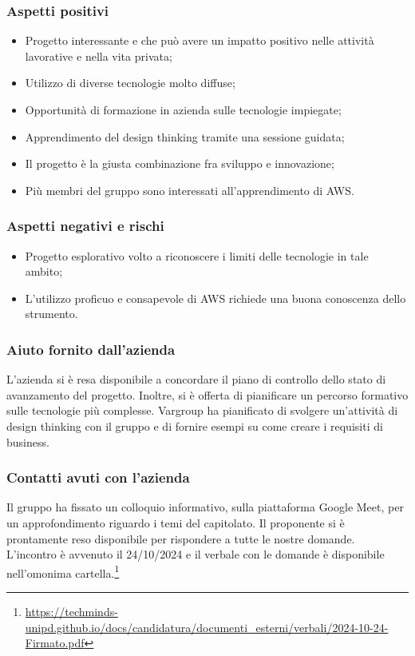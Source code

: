 \documentclass[10pt]{article}
\begin{document}
\subsubsection{Aspetti positivi}
\begin{itemize}
    \item Progetto interessante e che può avere un impatto positivo nelle attività lavorative e nella vita privata;
    \item Utilizzo di diverse tecnologie molto diffuse;
    \item Opportunità di formazione in azienda sulle tecnologie impiegate;
    \item Apprendimento del design thinking tramite una sessione guidata;
    \item Il progetto è la giusta combinazione fra sviluppo e innovazione;
    \item Più membri del gruppo sono interessati all’apprendimento di AWS.
\end{itemize}
\subsubsection{Aspetti negativi e rischi}
\begin{itemize}
    \item Progetto esplorativo volto a riconoscere i limiti delle tecnologie in tale ambito;
    \item L’utilizzo proficuo e consapevole di AWS richiede una buona conoscenza dello strumento.
\end{itemize}
\subsubsection{Aiuto fornito dall'azienda}
L’azienda si è resa disponibile a concordare il piano di controllo dello stato di avanzamento del progetto. Inoltre, si è offerta di pianificare un percorso formativo sulle tecnologie più complesse.
Vargroup ha pianificato di svolgere un’attività di design thinking con il gruppo e di fornire esempi su come creare i requisiti di business.
\subsubsection{Contatti avuti con l'azienda}
Il gruppo ha fissato un colloquio informativo, sulla piattaforma Google Meet, per un approfondimento riguardo i temi del capitolato. Il proponente si è prontamente reso disponibile per rispondere a tutte le nostre domande. L'incontro è avvenuto il 24/10/2024 e il verbale con le domande è disponibile nell'omonima cartella.\footnote{\url{https://techminds-unipd.github.io/docs/candidatura/documenti_esterni/verbali/2024-10-24-Firmato.pdf}}
\end{document}

